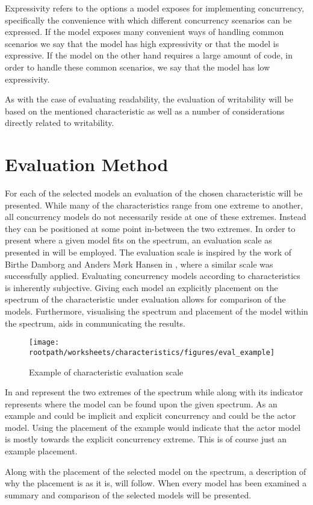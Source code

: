 Expressivity refers to the options a model exposes for implementing concurrency, specifically the convenience with which different concurrency scenarios can be expressed. If the model exposes many convenient ways of handling common scenarios we say that the model has high expressivity or that the model is expressive. If the model on the other hand requires a large amount of code, in order to handle these common scenarios, we say that the model has low expressivity.

As with the case of evaluating readability, the evaluation of writability will be based on the mentioned characteristic as well as a number of considerations directly related to writability.


\section{Evaluation Method}
For each of the selected models an evaluation of the chosen characteristic will be presented. While many of the characteristics range from one extreme to another, all concurrency models do not necessarily reside at one of these extremes. Instead they can be positioned at some point in-between the two extremes. In order to present where a given model fits on the spectrum, an evaluation scale as presented in  will be employed. The evaluation scale is inspired by the work of Birthe Damborg and Anders Mørk Hansen in \cite{StudyInConcurrency}, where a similar scale was successfully applied. Evaluating concurrency models according to characteristics is inherently subjective. Giving each model an explicitly placement on the spectrum of the characteristic under evaluation allows for comparison of the models. Furthermore, visualising the spectrum and placement of the model within the spectrum, aids in communicating the results.

\begin{figure}[ht!]
\centering
\texttt{[image: \\rootpath/worksheets/characteristics/figures/eval\_example]}
\caption{Example of characteristic evaluation scale}\label{fig:char_evel_example}
\end{figure}

In   and  represent the two extremes of the spectrum while  along with its indicator represents where the model  can be found upon the given spectrum. As an example  and  could be implicit and explicit concurrency and  could be the actor model. Using the placement of the example  would indicate that the actor model is mostly towards the explicit concurrency extreme. This is of course just an example placement.

Along with the placement of the selected model on the spectrum, a description of why the placement is as it is, will follow. When every model has been examined a summary and comparison of the selected models will be presented.
\worksheetend
